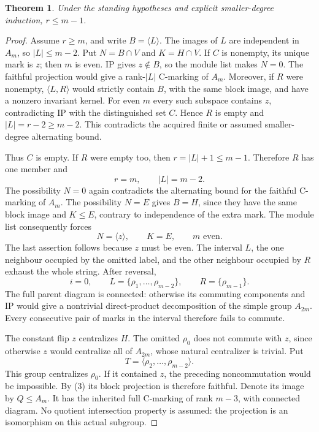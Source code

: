 \documentclass[11pt,a4paper]{article}
\newtheorem{theorem}[lemma]{Theorem}
\newcommand{\gen}[1]{\langle#1\rangle}
\begin{document}
\begin{theorem}
Under the standing hypotheses and explicit smaller-degree
induction, $r\le m-1$.
\end{theorem}
\begin{proof}
Assume $r\ge m$, and write $B=\gen L$.
The images of $L$ are independent in $A_m$, so
$|L|\le m-2$. Put $N=B\cap V$ and $K=H\cap V$.
If $C$ is nonempty, its unique mark is $z$; then $m$
is even. IP gives $z\notin B$, so the module list makes
$N=0$. The faithful projection would give a rank-$|L|$
C-marking of $A_m$. Moreover, if $R$ were nonempty,
$\gen{L,R}$ would strictly contain $B$, with the same
block image, and have a nonzero invariant kernel. For even
$m$ every such subspace contains $z$, contradicting IP
with the distinguished set $C$. Hence $R$ is empty and
$|L|=r-2\ge m-2$. This contradicts the acquired finite
or assumed smaller-degree alternating bound.

Thus $C$ is empty. If $R$ were empty too, then
$r=|L|+1\le m-1$. Therefore $R$ has one member and
\[
                   r=m,\qquad |L|=m-2.               \tag{2}
\]
The possibility $N=0$ again contradicts the alternating
bound for the faithful C-marking of $A_m$. The possibility
$N=E$ gives $B=H$, since they have the same block image
and $K\le E$, contrary to independence of the extra mark.
The module list consequently forces
\[
             N=\gen z,\qquad K=E,\qquad m\text{ even}.
                                                               \tag{3}
\]
The last assertion follows because $z$ must be even.
The interval $L$, the one neighbour occupied by the omitted
label, and the other neighbour occupied by $R$ exhaust the
whole string. After reversal,
\[
 i=0,\qquad L=\{\rho_1,\ldots,\rho_{m-2}\},
 \qquad R=\{\rho_{m-1}\}.
\]
The full parent diagram is connected: otherwise its commuting
components and IP would give a nontrivial direct-product
decomposition of the simple group $A_{2m}$. Every consecutive
pair of marks in the interval therefore fails to commute.

The constant flip $z$ centralizes $H$. The omitted $\rho_0$
does not commute with $z$, since otherwise $z$ would
centralize all of $A_{2m}$, whose natural centralizer is
trivial. Put
\[
                  T=\gen{\rho_2,\ldots,\rho_{m-2}}.
\]
This group centralizes $\rho_0$. If it contained $z$, the
preceding noncommutation would be impossible. By (3) its
block projection is therefore faithful. Denote its image
by $Q\le A_m$. It has the inherited full C-marking of rank
$m-3$, with connected diagram. No quotient intersection
property is assumed: the projection is an isomorphism on
this actual subgroup.


\end{proof}
\end{document}
